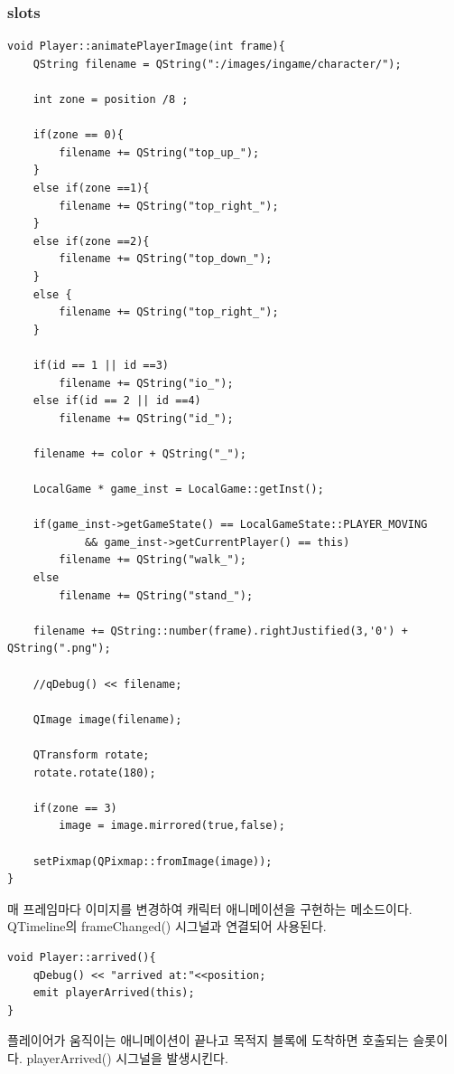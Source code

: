 \documentclass[10pt,oneside,a4paper,titlepage]{article}
\begin{document}
\subsubsection{slots}

\begin{lstlisting}
void Player::animatePlayerImage(int frame){
    QString filename = QString(":/images/ingame/character/");

    int zone = position /8 ;

    if(zone == 0){
        filename += QString("top_up_");
    }
    else if(zone ==1){
        filename += QString("top_right_");
    }
    else if(zone ==2){
        filename += QString("top_down_");
    }
    else {
        filename += QString("top_right_");
    }

    if(id == 1 || id ==3)
        filename += QString("io_");
    else if(id == 2 || id ==4)
        filename += QString("id_");

    filename += color + QString("_");

    LocalGame * game_inst = LocalGame::getInst();

    if(game_inst->getGameState() == LocalGameState::PLAYER_MOVING
            && game_inst->getCurrentPlayer() == this)
        filename += QString("walk_");
    else
        filename += QString("stand_");

    filename += QString::number(frame).rightJustified(3,'0') + QString(".png");

    //qDebug() << filename;

    QImage image(filename);

    QTransform rotate;
    rotate.rotate(180);

    if(zone == 3)
        image = image.mirrored(true,false);

    setPixmap(QPixmap::fromImage(image));
}

\end{lstlisting}

매 프레임마다 이미지를 변경하여 캐릭터 애니메이션을 구현하는 메소드이다. QTimeline의 frameChanged() 시그널과 연결되어 사용된다.\\

\begin{lstlisting}
void Player::arrived(){
    qDebug() << "arrived at:"<<position;
    emit playerArrived(this);
}
\end{lstlisting}
플레이어가 움직이는 애니메이션이 끝나고 목적지 블록에 도착하면 호출되는 슬롯이다. playerArrived() 시그널을 발생시킨다.\\
\end{document}
